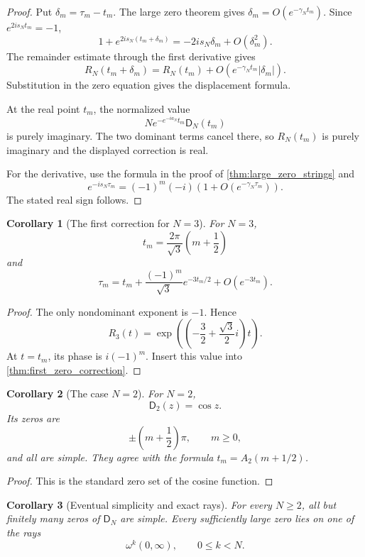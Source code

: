 \documentclass{aomart}
\newtheorem{corollary}[corollary]{Corollary}
\theoremstyle{definition}
\theoremstyle{remark}
\newcommand{\Dfun}{\mathsf D}
\begin{document}
\begin{proof}
Put $\delta_m=\tau_m-t_m$.  The large zero theorem gives $\delta_m=O(e^{-\gamma_Nt_m})$.  Since $e^{2is_Nt_m}=-1$,
\[
1+e^{2is_N(t_m+\delta_m)}
=
-2is_N\delta_m+O(\delta_m^2).
\]
The remainder estimate through the first derivative gives
\[
R_N(t_m+\delta_m)
=
R_N(t_m)+O(e^{-\gamma_Nt_m}|\delta_m|).
\]
Substitution in the zero equation gives the displacement formula.

At the real point $t_m$, the normalized value
\[
N e^{-e^{-ia_N}t_m}\Dfun_N(t_m)
\]
is purely imaginary.  The two dominant terms cancel there, so $R_N(t_m)$ is purely imaginary and the displayed correction is real.

For the derivative, use the formula in the proof of \cref{thm:large_zero_strings} and
\[
e^{-is_N\tau_m}
=
(-1)^m(-i)
\left(1+O(e^{-\gamma_N\tau_m})\right).
\]
The stated real sign follows.
\end{proof}

\begin{corollary}[The first correction for $N=3$]\label{cor:N3_zero_correction}
For $N=3$,
\[
t_m=\frac{2\pi}{\sqrt3}\left(m+\frac12\right)
\]
and
\[
\tau_m
=
t_m+
\frac{(-1)^m}{\sqrt3}e^{-3t_m/2}
+
O(e^{-3t_m}).
\]
\end{corollary}

\begin{proof}
The only nondominant exponent is $-1$.  Hence
\[
R_3(t)
=
\exp\left(\left(-\frac32+\frac{\sqrt3}{2}i\right)t\right).
\]
At $t=t_m$, its phase is $i(-1)^m$.  Insert this value into \cref{thm:first_zero_correction}.
\end{proof}

\begin{corollary}[The case $N=2$]\label{cor:case_two_zeros}
For $N=2$,
\[
\Dfun_2(z)=\cos z.
\]
Its zeros are
\[
\pm\left(m+\frac12\right)\pi,
\qquad m\geq0,
\]
and all are simple.  They agree with the formula $t_m=A_2(m+1/2)$.
\end{corollary}

\begin{proof}
This is the standard zero set of the cosine function.
\end{proof}

\begin{corollary}[Eventual simplicity and exact rays]\label{cor:eventual_simplicity}
For every $N\geq2$, all but finitely many zeros of $\Dfun_N$ are simple.  Every sufficiently large zero lies on one of the rays
\[
\omega^k(0,\infty),
\qquad 0\leq k<N.
\]
\end{corollary}
\end{document}
